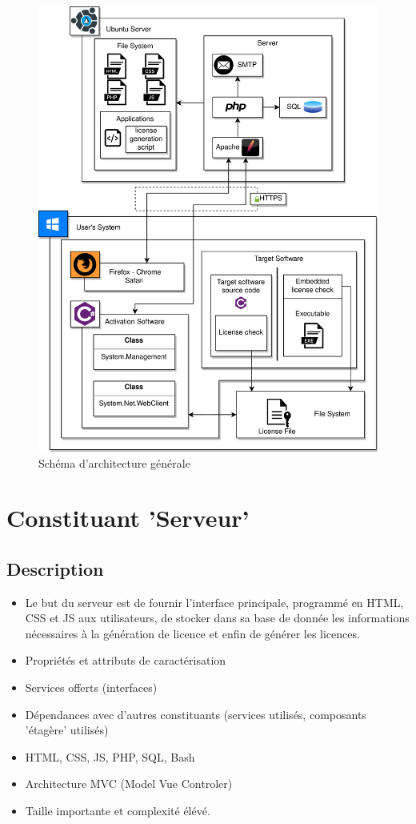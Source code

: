 \begin{figure}[h!]
	\centering
	\includegraphics{../png/DAT_general.png}
	\caption{Schéma d'architecture générale}
	\label{fig:fig1}
\end{figure}
\newpage

\section{Constituant 'Serveur'}
\subsection{Description}
\begin{itemize}
	\item Le but du serveur est de fournir l'interface principale, programmé 
				en HTML, CSS et JS aux utilisateurs, de stocker dans sa base de donnée
				les informations nécessaires à la génération de licence et enfin de générer 
				les licences.
	\item Propriétés et attributs de caractérisation
	\item Services offerts (interfaces)
	\item Dépendances avec d’autres constituants (services utilisés, composants 'étagère' utilisés)
	\item HTML, CSS, JS, PHP, SQL, Bash 
	\item Architecture MVC (Model Vue Controler)
	\item Taille importante et complexité élévé.
\end{itemize}
